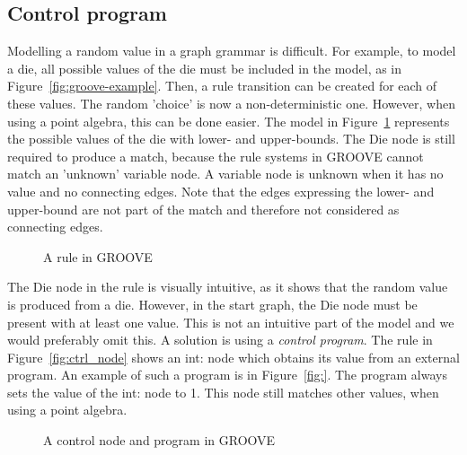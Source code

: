 \subsection{Control program}
Modelling a random value in a graph grammar is difficult. For example, to model a die, all possible values of the die must be included in the model, as in Figure~\ref{fig:groove-example}. Then, a rule transition can be created for each of these values. The random 'choice' is now a non-deterministic one. However, when using a point algebra, this can be done easier. The model in Figure~\ref{fig:placeholder_rule} represents the possible values of the die with lower- and upper-bounds. The Die node is still required to produce a match, because the rule systems in GROOVE cannot match an 'unknown' variable node. A variable node is unknown when it has no value and no connecting edges. Note that the edges expressing the lower- and upper-bound are not part of the match and therefore not considered as connecting edges.

\begin{figure}[ht]
  \begin{center}
    
  \end{center}
  \caption{A rule in GROOVE}
  \label{fig:placeholder_rule}
\end{figure}

The Die node in the rule is visually intuitive, as it shows that the random value is produced from a die. However, in the start graph, the Die node must be present with at least one value. This is not an intuitive part of the model and we would preferably omit this. A solution is using a \textit{control program}. The rule in Figure~\ref{fig:ctrl_node} shows an int: node which obtains its value from an external program. An example of such a program is in Figure~\ref{fig:}. The program always sets the value of the int: node to 1. This node still matches other values, when using a point algebra.

\begin{figure}[ht]
  \begin{center}
  \end{center}
  \caption{A control node and program in GROOVE}
  \label{fig:ctrl_program}
\end{figure}

